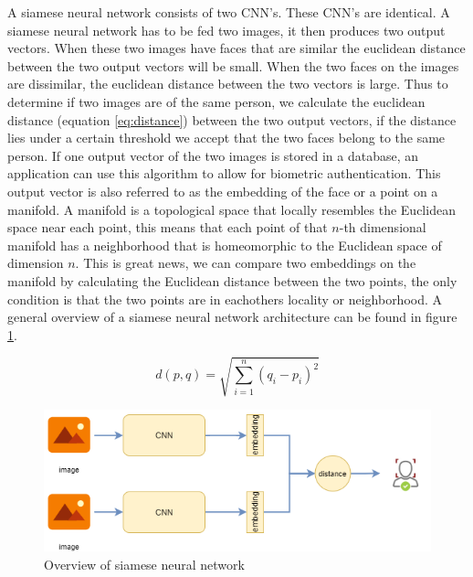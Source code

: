 A siamese neural network consists of two CNN's. These CNN's are identical. A siamese neural network has to be fed two images, it then produces two output vectors. When these two images have faces that are similar the euclidean distance between the two output vectors will be small. When the two faces on the images are dissimilar, the euclidean distance between the two vectors is large. Thus to determine if two images are of the same person, we calculate the euclidean distance (equation \ref{eq:distance}) between the two output vectors, if the distance lies under a certain threshold we accept that the two faces belong to the same person. If one output vector of the two images is stored in a database, an application can use this algorithm to allow for biometric authentication. This output vector is also referred to as the embedding of the face or a point on a manifold. A manifold is a topological space that locally resembles the Euclidean space near each point, this means that each point of that $n$-th dimensional manifold has a neighborhood that is homeomorphic to the Euclidean space of dimension $n$. This is great news, we can compare two embeddings on the manifold by calculating the Euclidean distance between the two points, the only condition is that the two points are in eachothers locality or neighborhood. A general overview of a siamese neural network architecture can be found in figure \ref{fig:siamese}.

\begin{equation} \label{eq:distance}
  d(p,q) = \sqrt{\sum_{i=1}^{n}(q_{i}-p_{i})^{2}}
\end{equation}

\begin{figure}[H]
  \includegraphics[width=\linewidth]{fig/siamese.png}
  \caption{Overview of siamese neural network}
  \label{fig:siamese}
\end{figure}

